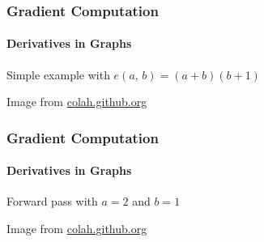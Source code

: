 \documentclass[xetex,professionalfont]{beamer}
\begin{document}
\begin{frame}
\frametitle{Gradient Computation}
\framesubtitle{Derivatives in Graphs}

Simple example with $e(a,\,b)=(a+b)(b+1)$

\medskip

\begin{center}
    {\centering Image from \href{https://colah.github.io/posts/2015-08-Backprop/}{colah.github.org}}
\end{center}

\end{frame}


\begin{frame}
\frametitle{Gradient Computation}
\framesubtitle{Derivatives in Graphs}

Forward pass with $a=2$ and $b=1$

\medskip


\begin{center}
    {\centering Image from \href{https://colah.github.io/posts/2015-08-Backprop/}{colah.github.org}}
\end{center}

\end{frame}
\end{document}
